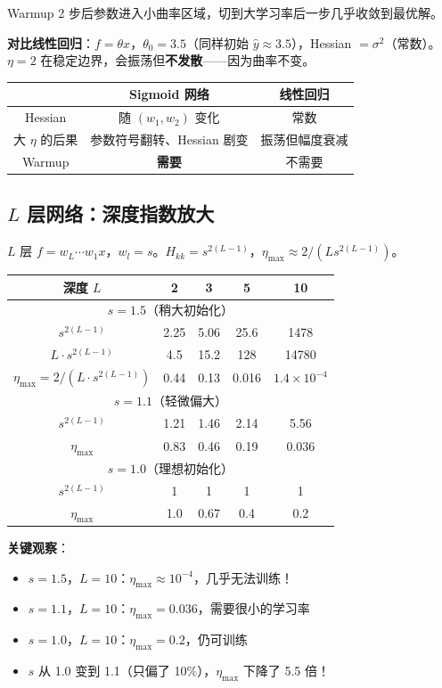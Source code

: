 \documentclass[12pt, a4paper]{ctexart}
\begin{document}
Warmup 2 步后参数进入小曲率区域，切到大学习率后一步几乎收敛到最优解。

\textbf{对比线性回归}：$f = \theta x$，$\theta_0 = 3.5$（同样初始 $\hat{y} \approx 3.5$），Hessian $= \sigma^2$（常数）。$\eta = 2$ 在稳定边界，会振荡但\textbf{不发散}——因为曲率不变。

\begin{center}
\begin{tabular}{c|cc}
 & Sigmoid 网络 & 线性回归 \\
\hline
Hessian & 随 $(w_1,w_2)$ 变化 & 常数 \\
大 $\eta$ 的后果 & 参数符号翻转、Hessian 剧变 & 振荡但幅度衰减 \\
Warmup & \textbf{需要} & 不需要 \\
\end{tabular}
\end{center}

\subsection{$L$ 层网络：深度指数放大}

$L$ 层 $f = w_L\cdots w_1 x$，$w_l = s$。$H_{kk} = s^{2(L-1)}$，$\eta_{\max} \approx 2/(Ls^{2(L-1)})$。

\begin{center}
\begin{tabular}{c|cccc}
深度 $L$ & 2 & 3 & 5 & 10 \\
\hline
\multicolumn{5}{c}{$s = 1.5$（稍大初始化）} \\
\hline
$s^{2(L-1)}$ & 2.25 & 5.06 & 25.6 & 1478 \\
$L \cdot s^{2(L-1)}$ & 4.5 & 15.2 & 128 & 14780 \\
$\eta_{\max} = 2/(L\cdot s^{2(L-1)})$ & 0.44 & 0.13 & 0.016 & $1.4 \times 10^{-4}$ \\
\hline
\multicolumn{5}{c}{$s = 1.1$（轻微偏大）} \\
\hline
$s^{2(L-1)}$ & 1.21 & 1.46 & 2.14 & 5.56 \\
$\eta_{\max}$ & 0.83 & 0.46 & 0.19 & 0.036 \\
\hline
\multicolumn{5}{c}{$s = 1.0$（理想初始化）} \\
\hline
$s^{2(L-1)}$ & 1 & 1 & 1 & 1 \\
$\eta_{\max}$ & 1.0 & 0.67 & 0.4 & 0.2 \\
\end{tabular}
\end{center}

\textbf{关键观察}：
\begin{itemize}
    \item $s = 1.5$，$L = 10$：$\eta_{\max} \approx 10^{-4}$，几乎无法训练！
    \item $s = 1.1$，$L = 10$：$\eta_{\max} = 0.036$，需要很小的学习率
    \item $s = 1.0$，$L = 10$：$\eta_{\max} = 0.2$，仍可训练
    \item $s$ 从 1.0 变到 1.1（只偏了 10\%），$\eta_{\max}$ 下降了 5.5 倍！
\end{itemize}
\end{document}
